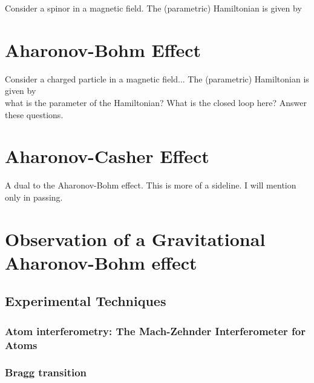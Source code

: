 \documentclass{article}
\theoremstyle{definition}
\begin{document}
Consider a spinor in a magnetic field. The (parametric) Hamiltonian is given by 



\section{Aharonov-Bohm Effect}

Consider a charged particle in a magnetic field... The (parametric) Hamiltonian is given by \\ 



what is the parameter of the Hamiltonian? What is the closed loop here? Answer these questions. 


\section{Aharonov-Casher Effect}

A dual to the Aharonov-Bohm effect. This is more of a sideline. I will mention only in passing.

\section{Observation of a Gravitational Aharonov-Bohm effect}




\subsection{Experimental Techniques}


\subsubsection{Atom interferometry: The Mach-Zehnder Interferometer for Atoms}

\subsubsection{Bragg transition}
\end{document}
